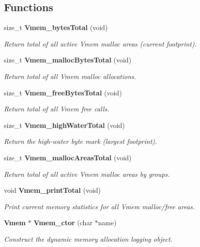 \subsection*{Functions}
\begin{DoxyCompactItemize}
\item 
size\_\-t {\bf Vmem\_\-bytesTotal} (void)
\begin{DoxyCompactList}\small\item\em Return total of all active Vmem malloc areas (current footprint). \item\end{DoxyCompactList}\item 
size\_\-t {\bf Vmem\_\-mallocBytesTotal} (void)
\begin{DoxyCompactList}\small\item\em Return total of all Vmem malloc allocations. \item\end{DoxyCompactList}\item 
size\_\-t {\bf Vmem\_\-freeBytesTotal} (void)
\begin{DoxyCompactList}\small\item\em Return total of all Vmem free calls. \item\end{DoxyCompactList}\item 
size\_\-t {\bf Vmem\_\-highWaterTotal} (void)
\begin{DoxyCompactList}\small\item\em Return the high-\/water byte mark (largest footprint). \item\end{DoxyCompactList}\item 
size\_\-t {\bf Vmem\_\-mallocAreasTotal} (void)
\begin{DoxyCompactList}\small\item\em Return total of all active Vmem malloc areas by groups. \item\end{DoxyCompactList}\item 
void {\bf Vmem\_\-printTotal} (void)
\begin{DoxyCompactList}\small\item\em Print current memory statistics for all Vmem malloc/free areas. \item\end{DoxyCompactList}\item 
{\bf Vmem} $\ast$ {\bf Vmem\_\-ctor} (char $\ast$name)
\begin{DoxyCompactList}\small\item\em Construct the dynamic memory allocation logging object. \item\end{DoxyCompactList}\item 

\end{DoxyCompactItemize}
